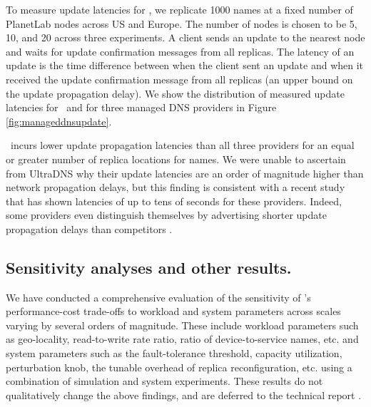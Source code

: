 To measure update latencies for \auspice, we replicate 1000 names at a fixed number of PlanetLab nodes across US and Europe. The number of nodes is chosen to be 5, 10, and 20 across three experiments. A client sends an update to the nearest node and waits for update confirmation messages from all replicas. The latency of an update is the time difference between when the client sent an update and when it received the update confirmation message from all replicas (an upper bound on the update propagation delay).  We show the distribution of measured update latencies for \auspice\ and for three managed DNS providers in Figure \ref{fig:manageddnsupdate}.   

\auspice\ incurs lower update propagation latencies than all three providers for an equal or greater number of replica locations for names. We were unable to ascertain from UltraDNS why their update latencies are an order of magnitude higher than network propagation delays, but this finding is consistent with a recent study \cite{dnscompare} that has shown latencies of up to tens of seconds for these providers. Indeed, some providers even distinguish themselves by advertising shorter update propagation delays than competitors \cite{dnscompare}.


\subsection{Sensitivity analyses and other results.} 
\label{sec:other} 
We have conducted a comprehensive evaluation of the sensitivity of \auspice's performance-cost trade-offs to workload and system parameters across scales varying by several orders of magnitude. These include workload parameters such as geo-locality, read-to-write rate ratio, ratio of device-to-service names, etc. and system parameters such as the fault-tolerance threshold, capacity utilization, perturbation knob, the tunable overhead of replica reconfiguration, etc. using a combination of simulation and system experiments. These results do not qualitatively change the above findings, and are deferred to the technical report \cite{techreport}.


